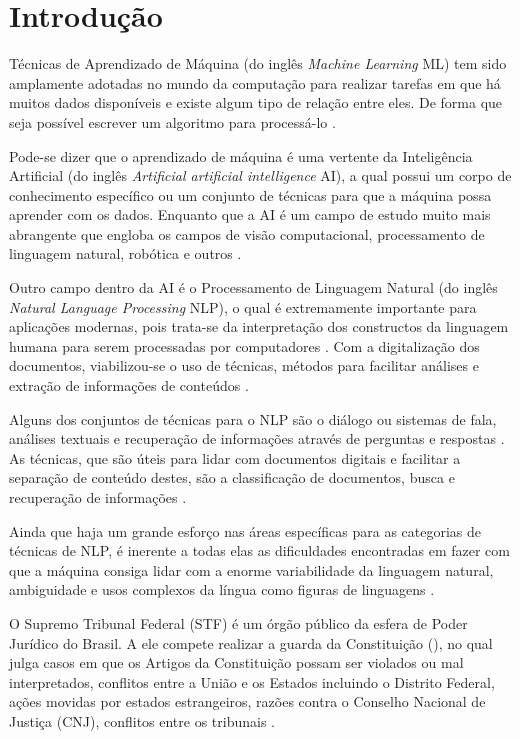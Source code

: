 \chapter[Introdução]{Introdução}

Técnicas de Aprendizado de Máquina (do inglês \textit{Machine Learning} ML) tem sido amplamente adotadas no mundo da computação para realizar tarefas em que há muitos dados disponíveis e existe algum tipo de relação entre eles. De forma que seja possível escrever um algoritmo para processá-lo \cite{BRINK2015}.

Pode-se dizer que o aprendizado de máquina é uma vertente da Inteligência Artificial (do inglês \textit{Artificial artificial intelligence} AI), a qual possui um corpo de conhecimento específico ou um conjunto de técnicas para que a máquina possa aprender com os dados. Enquanto que a AI é um campo de estudo muito mais abrangente que engloba os campos de visão computacional, processamento de linguagem natural, robótica e outros \cite{BRINK2015}. 

Outro campo dentro da AI é o Processamento de Linguagem Natural (do inglês \textit{Natural Language Processing} NLP), o qual é extremamente importante para aplicações modernas, pois trata-se da interpretação dos constructos da linguagem humana para serem processadas por computadores \cite{GOLDBERG2017}.
Com a digitalização dos documentos, viabilizou-se o uso de técnicas, métodos para facilitar análises e extração de informações de conteúdos \cite{OLIVEIRA2017}.

Alguns dos conjuntos de técnicas para o NLP são o diálogo ou sistemas de fala, análises textuais e recuperação de informações através de perguntas e respostas \cite{ESLICKandLIU2005}. As técnicas, que são úteis para lidar com documentos digitais e facilitar a separação de conteúdo destes, são a classificação de documentos, busca e recuperação de informações \cite{OLIVEIRA2017}.

Ainda que haja um grande esforço nas áreas específicas para as categorias de técnicas de NLP, é inerente a todas elas as dificuldades encontradas em fazer com que a máquina consiga lidar com a enorme variabilidade da linguagem natural, ambiguidade e usos complexos da língua como figuras de linguagens \cite{GOLDBERG2017}. 

O Supremo Tribunal Federal (STF) é um órgão público da esfera de Poder Jurídico do Brasil. A ele compete realizar a guarda da Constituição (\citeyear{BRASIL1988}), no qual julga casos em que os Artigos da Constituição possam ser violados ou mal interpretados, conflitos entre a União e os Estados incluindo o Distrito Federal, ações movidas por estados estrangeiros, razões contra o Conselho Nacional de Justiça (CNJ), conflitos entre os tribunais \cite{BRASIL1988}.

